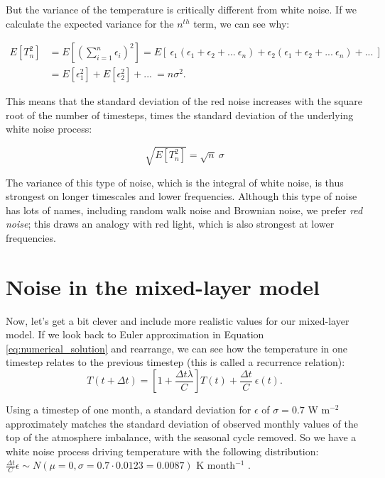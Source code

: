 \documentclass[12pt]{book}
\begin{document}
But the variance of the temperature is critically different from white noise. If we calculate the expected variance for the $n^{th}$ term, we can see why:

\begin{equation}
\begin{split}
E[T_n^2]  &  = E\left[ \left( \sum_{i=1}^n{\epsilon_i} \right)^{2} \right]   =E \left[ \ \epsilon_1(\epsilon_1 + \epsilon_2 + ... \  \epsilon_n ) +  \epsilon_2 (\epsilon_1 + \epsilon_2 + ... \ \epsilon_n ) + ... \ \right] \\
&=E \left[ \epsilon_1^2 \right] + E \left[ \epsilon_2^2 \right] + ... \ =  n\sigma^{2}.
\end{split}
\end{equation}

This means that the standard deviation of the red noise increases with the square root of the number of timesteps, times the standard deviation of the underlying white noise process:

$$\sqrt{E[T_n^2]} = \sqrt{n} \  \sigma$$

The variance of this type of noise, which is the integral of white noise, is thus strongest on longer timescales and lower frequencies. Although this type of noise has lots of names, including random walk noise and Brownian noise, we prefer \textit{red noise}; this draws an analogy with red light, which is also strongest at lower frequencies.

\section{Noise in the mixed-layer model}\label{noise-mlm}
Now, let's get a bit clever and include more realistic values for our mixed-layer model. If we look back to Euler approximation in Equation \ref{eq:numerical_solution} and rearrange, we can see how the temperature in one timestep relates to the previous timestep (this is called a recurrence relation):
\begin{equation}
T(t+\Delta t) =  \left[1 + \frac{\Delta t \lambda }{C}  \right] T(t) + \frac{\Delta t}{C} \ \epsilon(t).
\end{equation}

Using a timestep of one month, a standard deviation for $\epsilon$ of $\sigma=0.7$ W m$^{-2}$ approximately matches the standard deviation of observed monthly values of the top of the atmosphere imbalance, with the seasonal cycle removed. So we have a white noise process driving temperature with the following distribution:  $\frac{\Delta t}{C}\epsilon \sim N(\mu=0,\sigma=0.7 \cdot 0.0123= 0.0087)$ K month$^{-1}$ .
\end{document}
